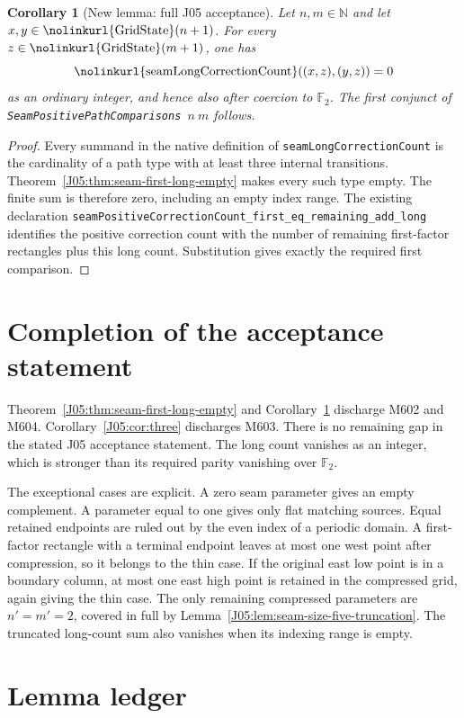 \documentclass[11pt,oneside]{report}
\newtheorem{corollary}[theorem]{Corollary}
\theoremstyle{definition}
\numberwithin{equation}{section}
\newcommand{\decl}[1]{\textnormal{\nolinkurl{#1}}}
\begin{document}
\begin{corollary}[New lemma: full J05 acceptance]
\label{J05:cor:seam-first-complete}
Let $n,m\in\mathbb N$ and let $x,y\in\decl{GridState}(n+1)$.
For every $z\in\decl{GridState}(m+1)$, one has
\[
 \decl{seamLongCorrectionCount}((x,z),(y,z))=0
\]
as an ordinary integer, and hence also after coercion to $\mathbb F_2$.
The first conjunct of \decl{SeamPositivePathComparisons}\ $n\ m$
follows.
\end{corollary}
\begin{proof}
Every summand in the native definition of
\decl{seamLongCorrectionCount} is the cardinality of a path type
with at least three internal transitions.
Theorem~\ref{J05:thm:seam-first-long-empty} makes every such type empty.
The finite sum is therefore zero, including an empty index range.
The existing declaration
\decl{seamPositiveCorrectionCount_first_eq_remaining_add_long}
identifies the positive correction count with the number of remaining
first-factor rectangles plus this long count.
Substitution gives exactly the required first comparison.
\end{proof}

\section{Completion of the acceptance statement}\label{J05:sec:completion}

Theorem~\ref{J05:thm:seam-first-long-empty} and
Corollary~\ref{J05:cor:seam-first-complete} discharge M602 and M604.
Corollary~\ref{J05:cor:three} discharges M603.
There is no remaining gap in the stated J05 acceptance statement.
The long count vanishes as an integer, which is stronger than its required
parity vanishing over $\mathbb F_2$.

The exceptional cases are explicit. A zero seam parameter gives an empty
complement. A parameter equal to one gives only flat matching sources.
Equal retained endpoints are ruled out by the even index of a periodic
domain. A first-factor rectangle with a terminal endpoint leaves at most
one west point after compression, so it belongs to the thin case.
If the original east low point is in a boundary column, at most one east
high point is retained in the compressed grid, again giving the thin case.
The only remaining compressed parameters are $n'=m'=2$, covered in full by
Lemma~\ref{J05:lem:seam-size-five-truncation}.
The truncated long-count sum also vanishes when its indexing range is empty.

\section{Lemma ledger}
\end{document}
